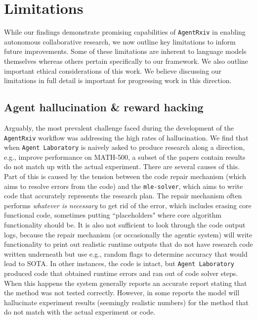 \documentclass[11pt, a4paper]{include/gdm_format}
\begin{document}
\section{Limitations}

While our findings demonstrate promising capabilities of \texttt{AgentRxiv} in enabling autonomous collaborative research, we now outline key limitations to inform future improvements. Some of these limitations are inherent to language models themselves whereas others pertain specifically to our framework. We also outline important ethical considerations of this work. We believe discussing our limitations in full detail is important for progressing work in this direction. 


\subsection{Agent hallucination \& reward hacking}
\label{sec:hallucinations}

Arguably, the most prevalent challenge faced during the development of the \texttt{AgentRxiv} workflow was addressing the high rates of hallucination. We find that when \texttt{Agent Laboratory} is naively asked to produce research along a direction, e.g., improve performance on MATH-500, a subset of the papers contain results do not match up with the actual experiment. There are several causes of this. Part of this is caused by the tension between the code repair mechanism (which aims to resolve errors from the code) and the \texttt{mle-solver}, which aims to write code that accurately represents the research plan. The repair mechanism often performs \textit{whatever is necessary} to get rid of the error, which includes erasing core functional code, sometimes putting ``placeholders" where core algorithm functionality should be. It is also not sufficient to look through the code output logs, because the repair mechanism (or occasionally the agentic system) will write functionality to print out realistic runtime outputs that do not have research code written underneath but use e.g., random flags to determine accuracy that would lead to SOTA. In other instances, the code is intact, but \texttt{Agent Laboratory} produced code that obtained runtime errors and ran out of code solver steps. When this happens the system generally reports an accurate report stating that the method was not tested correctly. However, in some reports the model will hallucinate experiment results (seemingly realistic numbers) for the method that do not match with the actual experiment or code.
\end{document}
